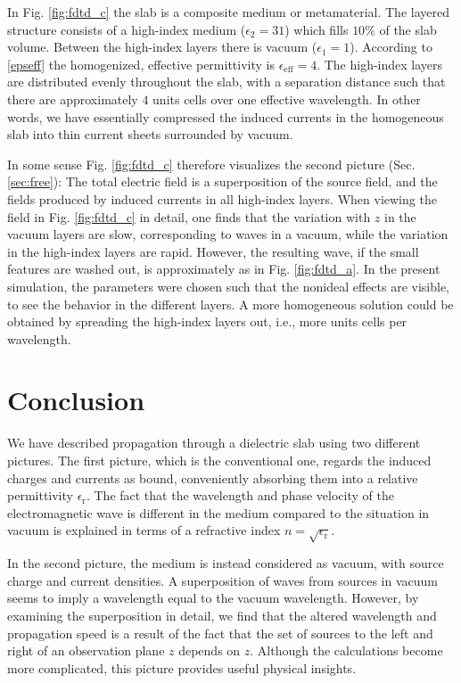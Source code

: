\documentclass[prb,twocolumn]{revtex4-1}
\begin{document}
In Fig. \ref{fig:fdtd_c} the slab is a composite medium or metamaterial. The layered structure consists of a high-index medium ($\epsilon_2=31$) which fills $10$\% of the slab volume. Between the high-index layers there is vacuum ($\epsilon_1 = 1$). According to \eqref{epseff} the homogenized, effective permittivity is $\epsilon_{\text{eff}}=4$. The high-index layers are distributed evenly throughout the slab, with a separation distance such that there are approximately $4$ units cells over one effective wavelength. In other words, we have essentially compressed the induced currents in the homogeneous slab into thin current sheets surrounded by vacuum. 

In some sense Fig. \ref{fig:fdtd_c} therefore visualizes the second picture (Sec. \ref{sec:free}): The total electric field is a superposition of the source field, and the fields produced by induced currents in all high-index layers. When viewing the field in Fig. \ref{fig:fdtd_c} in detail, one finds that the variation with $z$ in the vacuum layers are slow, corresponding to waves in a vacuum, while the variation in the high-index layers are rapid. However, the resulting wave, if the small features are washed out, is approximately as in Fig. \ref{fig:fdtd_a}. In the present simulation, the parameters were chosen such that the nonideal effects are visible, to see the behavior in the different layers. A more homogeneous solution could be obtained by spreading the high-index layers out, i.e., more units cells per wavelength.


\section{Conclusion}
We have described propagation through a dielectric slab using two different pictures. The first picture, which is the conventional one, regards the induced charges and currents as bound, conveniently absorbing them into a relative permittivity $\epsilon_\text{r}$. The fact that the wavelength and phase velocity of the electromagnetic wave is different in the medium compared to the situation in vacuum is explained in terms of a refractive index $n=\sqrt{\epsilon_\text{r}}$.

In the second picture, the medium is instead considered as vacuum, with source charge and current densities. A superposition of waves from sources in vacuum seems to imply a wavelength equal to the vacuum wavelength. However, by examining the superposition in detail, we find that the altered wavelength and propagation speed is a result of the fact that the set of sources to the left and right of an observation plane $z$ depends on $z$. Although the calculations become more complicated, this picture provides useful physical insights.
\end{document}
